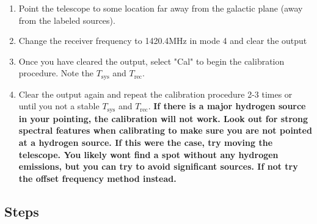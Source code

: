 \begin{enumerate}
	\item Point the telescope to some location far away from the galactic plane (away from the labeled sources). 
	
	\item Change the receiver frequency to 1420.4MHz in mode 4 and clear the output
	
	\item Once you have cleared the output, select "Cal" to begin the calibration procedure. Note the $T_\textrm{sys}$ and $T_\textrm{rec}$.
	
	\item  Clear the output again and repeat the calibration procedure 2-3 times or until you not a stable $T_\textrm{sys}$ and $T_\textrm{rec}$. \textbf{If there is a major hydrogen source in your pointing, the calibration will not work. Look out for strong spectral features when calibrating to make sure you are not pointed at a hydrogen source. If this were the case, try moving the telescope. You likely wont find a spot without any hydrogen emissions, but you can try to avoid significant sources. If not try the offset frequency method instead.} 
\end{enumerate}


\subsection{Steps}

